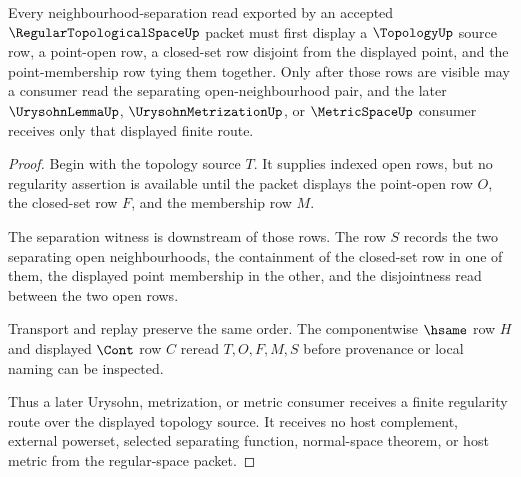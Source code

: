 \begin{theorem}
\label{thm:regular-topological-space-neighborhood-separation}
Every neighbourhood-separation read exported by an accepted $\RegularTopologicalSpaceUp$ packet must first display a $\TopologyUp$ source row, a point-open row, a closed-set row disjoint from the displayed point, and the point-membership row tying them together. Only after those rows are visible may a consumer read the separating open-neighbourhood pair, and the later $\UrysohnLemmaUp$, $\UrysohnMetrizationUp$, or $\MetricSpaceUp$ consumer receives only that displayed finite route.
\end{theorem}
\begin{proof}
Begin with the topology source $T$. It supplies indexed open rows, but no regularity assertion is available until the packet displays the point-open row $O$, the closed-set row $F$, and the membership row $M$.

The separation witness is downstream of those rows. The row $S$ records the two separating open neighbourhoods, the containment of the closed-set row in one of them, the displayed point membership in the other, and the disjointness read between the two open rows.

Transport and replay preserve the same order. The componentwise $\hsame$ row $H$ and displayed $\Cont$ row $C$ reread $T,O,F,M,S$ before provenance or local naming can be inspected.

Thus a later Urysohn, metrization, or metric consumer receives a finite regularity route over the displayed topology source. It receives no host complement, external powerset, selected separating function, normal-space theorem, or host metric from the regular-space packet.
\end{proof}




